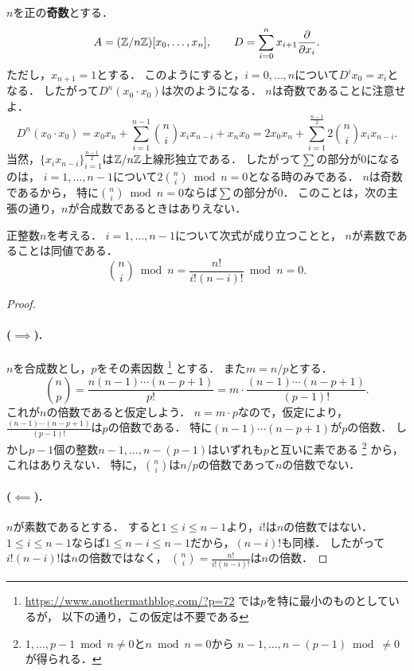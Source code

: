 \documentclass[a4paper]{jsarticle}
\begin{document}
\begin{Example}
    $n$を正の\textbf{奇数}とする．
    \[
        A=(\mathbb{Z}/n\mathbb{Z})[x_0,\dots,x_n],
        \hspace{20pt}
        D=\sum_{i=0}^{n} x_{i+1} \frac{\partial}{\partial x_{i}}.
    \]
    ただし，$x_{n+1}=1$とする．
    このようにすると，$i=0,\dots,n$について$D^i x_0=x_{i}$となる．
    したがって$D^n(x_0 \cdot x_0)$は次のようになる．
    $n$は奇数であることに注意せよ．
    \[
        D^n(x_0 \cdot x_0)
        =x_0 x_n + \sum_{i=1}^{n-1} \binom{n}{i} x_i x_{n-i} + x_n x_0
        =2 x_0 x_n+\sum_{i=1}^{\frac{n-1}{2}} 2 \binom{n}{i} x_i x_{n-i}.
    \]
    当然，$\{x_i x_{n-i}\}_{i=1}^{\frac{n-1}{2}}$は$\mathbb{Z}/n\mathbb{Z}$上線形独立である．
    したがって$\sum$の部分が$0$になるのは，
    $i=1,\dots,n-1$について$2\binom{n}{i} \bmod n=0$となる時のみである．
    $n$は奇数であるから，
    特に$\binom{n}{i} \bmod n=0$ならば$\sum$の部分が$0$．
    このことは，次の主張の通り，$n$が合成数であるときはありえない．
\end{Example}

\begin{Prop}
    正整数$n$を考える．
    $i=1,\dots,n-1$について次式が成り立つことと，
    $n$が素数であることは同値である．
    \[ \binom{n}{i} \bmod n=\frac{n!}{i! (n-i)!} \bmod n=0. \]
\end{Prop}
\begin{proof}
    \paragraph{($\implies$).}
    $n$を合成数とし，$p$をその素因数
    \footnote
    {
        \url{https://www.anothermathblog.com/?p=72}
        では$p$を特に最小のものとしているが，
        以下の通り，この仮定は不要である
    }
    とする．
    また$m=n/p$とする．
    \[
        \binom{n}{p}
        =\frac{n(n-1)\cdots(n-p+1)}{p!}
        =m \cdot \frac{(n-1)\cdots(n-p+1)}{(p-1)!}.
    \]
    これが$n$の倍数であると仮定しよう．
    $n=m \cdot p$なので，仮定により，
    $\frac{(n-1)\cdots(n-p+1)}{(p-1)!}$は$p$の倍数である．
    特に$(n-1)\cdots(n-p+1)$が$p$の倍数．
    しかし$p-1$個の整数$n-1, \dots, n-(p-1)$はいずれも$p$と互いに素である
    \footnote
    {
        $1, \dots, p-1 \bmod n \neq 0$と$n \bmod n=0$から
        $n-1, \dots, n-(p-1) \bmod \neq 0$が得られる．
    }
    から，
    これはありえない．
    特に，$\binom{n}{i}$は$n/p$の倍数であって$n$の倍数でない．

    \paragraph{($\impliedby$).}
    $n$が素数であるとする．
    すると$1 \leq i \leq n-1$より，$i!$は$n$の倍数ではない．
    $1 \leq i \leq n-1$ならば$1 \leq n-i \leq n-1$だから，$(n-i)!$も同様．
    したがって$i! (n-i)!$は$n$の倍数ではなく，
    $\binom{n}{i}=\frac{n!}{i! (n-i)!}$は$n$の倍数．
\end{proof}
\end{document}
